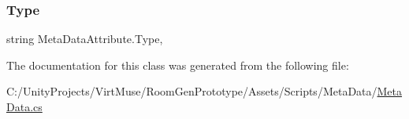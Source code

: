 \mbox{\label{class_meta_data_attribute_a99c1ec7f87489d95f2221e7f71976066}} 
\subsubsection{\texorpdfstring{Type}{Type}}
{\footnotesize\ttfamily string Meta\+Data\+Attribute.\+Type\hspace{0.3cm}{\ttfamily [get]}, {}}



The documentation for this class was generated from the following file\+:\begin{DoxyCompactItemize}
\item 
C\+:/\+Unity\+Projects/\+Virt\+Muse/\+Room\+Gen\+Prototype/\+Assets/\+Scripts/\+Meta\+Data/\mbox{\hyperlink{_meta_data_8cs}{Meta\+Data.\+cs}}\end{DoxyCompactItemize}
